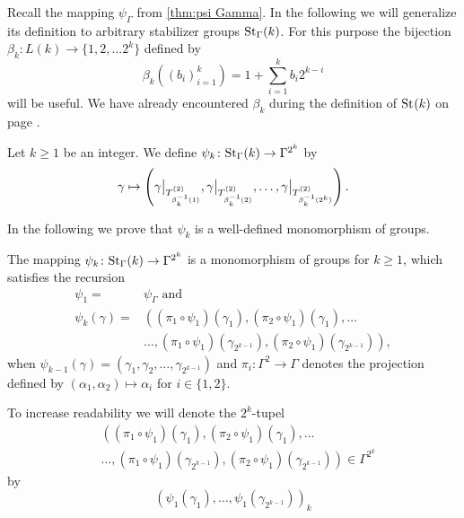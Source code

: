 Recall the mapping $\psi_\Gamma$ from \cref{thm:psi Gamma}. In the following we will generalize its definition to arbitrary stabilizer groups $\St[\Gamma]{k}$. For this purpose the bijection $\beta_k\colon L(k)\to\lbrace 1,2,\ldots 2^k\rbrace$ defined by
\begin{equation*}
\beta_k\left((b_i)_{i=1}^k\right)=1+\sum_{i=1}^{k} b_{i}2^{k-i}
\end{equation*}
will be useful. We have already encountered $\beta_k$ during the definition of $\St{k}$ on page \pageref{def:Stabilizer Group}.
\begin{defin}
Let $k\geq 1$ be an integer. We define $\psi_k\colon\St[\Gamma]{k}\to\Gamma^{2^k}$ by
\begin{equation*}
\gamma\mapsto\left(\gamma\big\vert_{\ST{\beta_k^{-1}(1)}},\gamma\big\vert_{\ST{\beta_k^{-1}(2)}},\ldots,\gamma\big\vert_{\ST{\beta_k^{-1}(2^k)}}\right).
\end{equation*}
\end{defin}
In the following we prove that $\psi_k$ is a well-defined monomorphism of groups.
\begin{thm}\label{thm:psi k}
The mapping $\psi_k\colon\St[\Gamma]{k}\to\Gamma^{2^k}$ is a monomorphism of groups for $k\geq1$, which satisfies the recursion
\begin{align}
\psi_1=&\psi_\Gamma\text{ and}\label{eq:psi1=psiGamma}\\
\psi_k(\gamma)=&\left((\pi_1\circ\psi_1)(\gamma_1),(\pi_2\circ\psi_1)(\gamma_1),\ldots\right.\\
	&\left.\ldots,(\pi_1\circ\psi_1)(\gamma_{2^{k-1}}),(\pi_2\circ\psi_1)(\gamma_{2^{k-1}})\right),\nonumber
\end{align}
when $\psi_{k-1}(\gamma)=(\gamma_1,\gamma_2,\ldots,\gamma_{2^{k-1}})$ and $\pi_i\colon\Gamma^2\to\Gamma$ denotes the projection defined by $(\alpha_1,\alpha_2)\mapsto\alpha_i$ for $i\in\lbrace 1,2\rbrace$.
\end{thm}
To increase readability we will denote the $2^k$-tupel
\begin{align*}
&\left((\pi_1\circ\psi_1)(\gamma_1),(\pi_2\circ\psi_1)(\gamma_1),\ldots\right.\\
&\left.\ldots,(\pi_1\circ\psi_1)(\gamma_{2^{k-1}}),(\pi_2\circ\psi_1)(\gamma_{2^{k-1}})\right)\in\Gamma^{2^k}
\end{align*}
by 
\begin{equation}\label{eq:Notation for projections}
\left(\psi_1(\gamma_1),\ldots,\psi_1(\gamma_{2^{k-1}})\right)_k
\end{equation}
